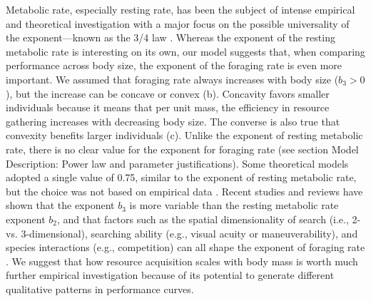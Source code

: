 Metabolic rate, especially resting rate, has been the subject of intense empirical and theoretical investigation with a major focus on the possible universality of the exponent---known as the 3/4 law \citep{Peters1986,West1997, Kozlowski1997, Brown2004, Isaac2010}.
Whereas the exponent of the resting metabolic rate is interesting on its own, our model suggests that, when comparing performance across body size, the exponent of the foraging rate is even more important.
We assumed that foraging rate always increases with body size ($b_3 > 0$), but the increase can be concave or convex (b).
Concavity favors smaller individuals because it means that per unit mass, the efficiency in resource gathering increases with decreasing body size.
The converse is also true that convexity benefits larger individuals (c).
Unlike the exponent of resting metabolic rate, there is no clear value for the exponent for foraging rate (see section Model Description: Power law and parameter justifications). %
Some theoretical models adopted a single value of 0.75, similar to the exponent of resting metabolic rate, but the choice was not based on empirical data \citep{Yodzis1992, Brown1993}.
Recent studies and reviews have shown that the exponent $b_3$ is more variable than the resting metabolic rate exponent $b_2$, and that factors such as the spatial dimensionality of search (i.e., 2- vs. 3-dimensional), searching ability (e.g., visual acuity or maneuverability), and species interactions (e.g., competition) can all shape the exponent of foraging rate \citep{Pawar2012, Kalinkat2015}.
We suggest that how resource acquisition scales with body mass is worth much further empirical investigation because of its potential to generate different qualitative patterns in performance curves.


